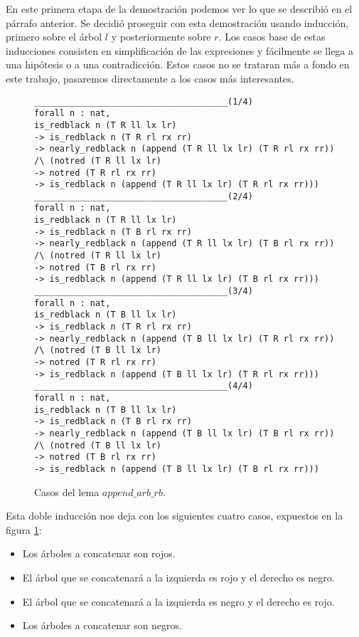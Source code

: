 En este primera etapa de la demostraci\'on podemos ver lo que se describió en el párrafo anterior.
Se decidió proseguir con esta demostraci\'on usando inducci\'on, primero sobre el árbol $l$ y
posteriormente sobre $r$. Los casos base de estas inducciones consisten en simplificación de las
expresiones y fácilmente se llega a una hipótesis o a una contradicci\'on. Estos casos no se
trataran m\'as a fondo en este trabajo, pasaremos directamente a los casos m\'as interesantes.



\begin{figure}[!ht]
\centering
\captionsetup{justification=centering}
\begin{verbatim}
______________________________________(1/4)
forall n : nat,
is_redblack n (T R ll lx lr)
-> is_redblack n (T R rl rx rr)
-> nearly_redblack n (append (T R ll lx lr) (T R rl rx rr))
/\ (notred (T R ll lx lr)
-> notred (T R rl rx rr)
-> is_redblack n (append (T R ll lx lr) (T R rl rx rr)))
______________________________________(2/4)
forall n : nat,
is_redblack n (T R ll lx lr)
-> is_redblack n (T B rl rx rr)
-> nearly_redblack n (append (T R ll lx lr) (T B rl rx rr))
/\ (notred (T R ll lx lr)
-> notred (T B rl rx rr)
-> is_redblack n (append (T R ll lx lr) (T B rl rx rr)))
______________________________________(3/4)
forall n : nat,
is_redblack n (T B ll lx lr)
-> is_redblack n (T R rl rx rr)
-> nearly_redblack n (append (T B ll lx lr) (T R rl rx rr))
/\ (notred (T B ll lx lr)
-> notred (T R rl rx rr)
-> is_redblack n (append (T B ll lx lr) (T R rl rx rr)))
______________________________________(4/4)
forall n : nat,
is_redblack n (T B ll lx lr)
-> is_redblack n (T B rl rx rr)
-> nearly_redblack n (append (T B ll lx lr) (T B rl rx rr))
/\ (notred (T B ll lx lr)
-> notred (T B rl rx rr)
-> is_redblack n (append (T B ll lx lr) (T B rl rx rr)))
\end{verbatim}
\caption{Casos del lema $append\_arb\_rb$.}
\label{casos_append}
\end{figure}

Esta doble inducci\'on nos deja con los siguientes cuatro casos, expuestos en la figura \ref{casos_append}:
\begin{itemize}
    \item Los \'arboles a concatenar son rojos.
    \item El \'arbol que se concatenar\'a a la izquierda es rojo y el derecho 
es negro.
    \item El \'arbol que se concatenar\'a a la izquierda es negro y el derecho 
es rojo.
    \item Los \'arboles a concatenar son negros.
\end{itemize}


